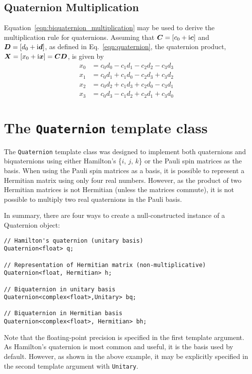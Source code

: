 \documentclass[12pt]{article}
\newcommand{\Ci}{{\rm i}}
\newcommand{\code}[1]{{\tt{#1}}}
\begin{document}
\subsection{Quaternion Multiplication}
Equation~\ref{eqn:biquaternion_multiplication} may be used to derive
the multiplication rule for quaternions.  Assuming that
$\bm{C}=[c_0+\Ci\bm{c}]$ and $\bm{D}=[d_0+\Ci\bm{d}]$, as defined in
Eq.~\ref{eqn:quaternion}, the quaternion product,
$\bm{X}=[x_0+\Ci\bm{x}]=\bm{CD}$, is given by
\begin{equation}\label{eqn:quaternion_multiplication}
\begin{array}{rl}
x_0 & = c_0d_0 - c_1d_1 - c_2d_2 - c_3d_3 \\
x_1 & = c_0d_1 + c_1d_0 - c_2d_3 + c_3d_2 \\
x_2 & = c_0d_2 + c_1d_3 + c_2d_0 - c_3d_1 \\
x_3 & = c_0d_3 - c_1d_2 + c_2d_1 + c_3d_0
\end{array}
\end{equation}

\section{The \code{Quaternion} template class}

The \code{Quaternion} template class was designed to implement both
quaternions and biquaternions using either Hamilton's \{$i$, $j$,
$k$\} or the Pauli spin matrices as the basis.  When using the Pauli
spin matrices as a basis, it is possible to represent a Hermitian
matrix using only four real numbers.  However, as the product of two
Hermitian matrices is not Hermitian (unless the matrices commute), it
is not possible to multiply two real quaternions in the Pauli basis.

In summary, there are four ways to create a null-constructed instance
of a Quaternion object:
\begin{verbatim}
// Hamilton's quaternion (unitary basis)
Quaternion<float> q;

// Representation of Hermitian matrix (non-multiplicative)
Quaternion<float, Hermitian> h;

// Biquaternion in unitary basis
Quaternion<complex<float>,Unitary> bq;

// Biquaternion in Hermitian basis
Quaternion<complex<float>, Hermitian> bh;
\end{verbatim}
Note that the floating-point precision is specified in the first
template argument.  As Hamilton's quaternion is most common and
useful, it is the basis used by default.  However, as shown in the
above example, it may be explicitly specified in the second template
argument with \code{Unitary}.
\end{document}
